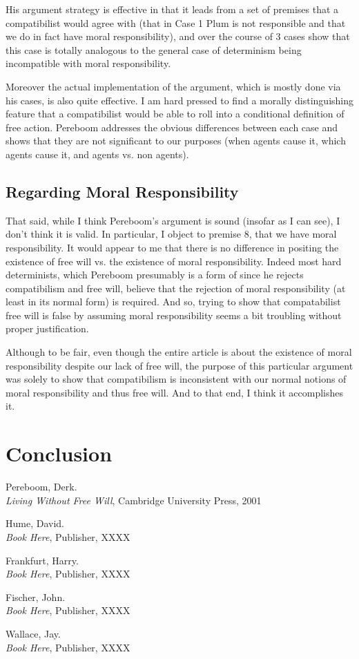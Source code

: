 \documentclass{article}
\begin{document}
His argument strategy is effective in that it leads from a set of premises that a compatibilist would agree with (that in Case 1 Plum is not responsible and that we do in fact have moral responsibility), and over the course of 3 cases show that this case is totally analogous to the general case of determinism being incompatible with moral responsibility.

Moreover the actual implementation of the argument, which is mostly done via his cases, is also quite effective. I am hard pressed to find a morally distinguishing feature that a compatibilist would be able to roll into a conditional definition of free action. Pereboom addresses the obvious differences between each case and shows that they are not significant to our purposes (when agents cause it, which agents cause it, and agents vs. non agents).

\subsection{Regarding Moral Responsibility}
That said, while I think Pereboom's argument is sound (insofar as I can see), I don't think it is valid. In particular, I object to premise 8, that we have moral responsibility. It would appear to me that there is no difference in positing the existence of free will vs. the existence of moral responsibility. Indeed most hard determinists, which Pereboom presumably is a form of since he rejects compatibilism and free will, believe that the rejection of moral responsibility (at least in its normal form) is required. And so, trying to show that compatabilist free will is false by assuming moral responsibility seems a bit troubling without proper justification.

Although to be fair, even though the entire article is about the existence of moral responsibility despite our lack of free will, the purpose of this particular argument was solely to show that compatibilism is inconsistent with our normal notions of moral responsibility and thus free will. And to that end, I think it accomplishes it.

\section{Conclusion}


\begin{thebibliography}{999}
  Pereboom, Derk.\\
  \emph{Living Without Free Will}, Cambridge University Press, 2001

  Hume, David.\\
  \emph{Book Here}, Publisher, XXXX

  Frankfurt, Harry.\\
  \emph{Book Here}, Publisher, XXXX

  Fischer, John.\\
  \emph{Book Here}, Publisher, XXXX

  Wallace, Jay.\\
  \emph{Book Here}, Publisher, XXXX
\end{thebibliography}
\end{document}
